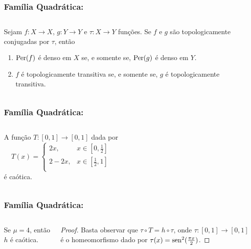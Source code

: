 \begin{frame}
\vspace{5pt}
\frametitle{Família Quadrática: \subsecname}
\begin{columns}
\column{\dimexpr\paperwidth-15pt}

\begin{proposition}
Sejam $f: X \to X$, $g: Y \to Y$ e $\tau: X \to Y$ funções. Se $f$ e $g$ são topologicamente conjugadas por $\tau$, então
\begin{enumerate}
\item $\operatorname{Per}(f)$ é denso em $X$ se, e somente se, $\operatorname{Per}(g)$ é denso em $Y$.
\item $f$ é topologicamente transitiva se, e somente se, $g$ é topologicamente transitiva.
\end{enumerate}
\end{proposition}

\end{columns}
\end{frame}


\begin{frame}
\vspace{5pt}
\frametitle{Família Quadrática: \subsecname}
\begin{columns}
\column{\dimexpr\paperwidth-15pt}

\begin{lemma}
A função $T: [0,1] \to [0,1]$ dada por
\[ T(x) =
  \begin{cases}
    2x, & x \in \left[ 0, \frac{1}{2} \right] \\
    2 - 2x, & x \in \left[ \frac{1}{2}, 1 \right] \\
  \end{cases}
\]
é caótica.
\end{lemma}

\end{columns}
\end{frame}


\begin{frame}
\vspace{5pt}
\frametitle{Família Quadrática: \subsecname}
\begin{columns}
\column{\dimexpr\paperwidth-15pt}

\begin{theorem}
Se $\mu = 4$, então $h$ é caótica.
\end{theorem}

\begin{proof}
Basta observar que $\tau \circ T = h \circ \tau$, onde $\tau: [0, 1] \to [0, 1]$ é o homeomorfismo dado por $\tau(x) = \operatorname{sen}^2(\frac{\pi x}{2})$.
\end{proof}

\end{columns}
\end{frame}

